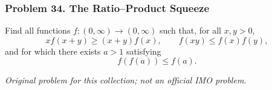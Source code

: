 \subsubsection*{Problem 34. The Ratio--Product Squeeze}

\begin{exercisebox}[hard]

Find all functions $f:(0,\infty)\to(0,\infty)$ such that, for all
$x,y>0$,
\[
x f(x+y)\ge (x+y)f(x),
\qquad
f(xy)\le f(x)f(y),
\]
and for which there exists $a>1$ satisfying
\[
f(f(a))\le f(a).
\]

\begin{flushright}
\textit{Original problem for this collection; not an official IMO problem.}
\end{flushright}


\end{exercisebox}